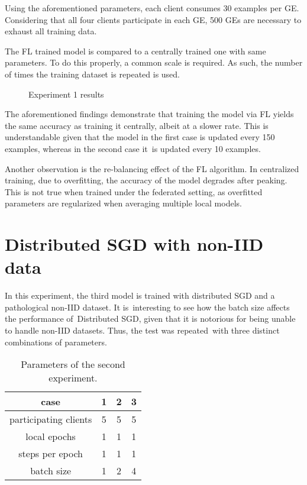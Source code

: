 Using the aforementioned parameters, each client consumes 30 examples per GE. Considering that all four clients participate in each GE, 500 GEs are necessary to exhaust all training data.

The FL trained model is compared to a centrally trained one with same parameters. To do this properly, a common scale is required. As such, the number of times the training dataset is repeated is used.

\begin{figure}[H]
    \center
    
    \caption[Experiment 1 results]{Experiment 1 results}
    \label{fig:Experiment 1 results}
\end{figure}

The aforementioned findings demonstrate that training the model via FL yields the same accuracy as training it centrally, albeit at a slower rate. This is understandable given that the model in the first case is updated every 150 examples, whereas in the second case it is updated every 10 examples.

Another observation is the re-balancing effect of the FL algorithm. In centralized training, due to overfitting, the accuracy of the model degrades after peaking. This is not true when trained under the federated setting, as overfitted parameters are regularized when averaging multiple local models.

\section{Distributed SGD with non-IID data}
In this experiment, the third model is trained with distributed SGD and a pathological non-IID dataset. It is interesting to see how the batch size affects the performance of Distributed SGD, given that it is notorious for being unable to handle non-IID datasets. Thus, the test was repeated with three distinct combinations of parameters.

\begin{table}[H]
    \center
    \begin{tabular}{ | c | c | c | c | }
        \hline
        case & 1 & 2 & 3\\
        \hline\hline
        participating clients & 5 & 5 & 5 \\
        \hline
        local epochs & 1 & 1 & 1 \\
        \hline
        steps per epoch & 1 & 1 & 1 \\
        \hline
        batch size & 1 & 2 & 4 \\
        \hline
    \end{tabular}
    \caption[Experiment 2 Parameters]{Parameters of the second experiment.}
    \label{table:Experiment 2 parameters}
\end{table}


